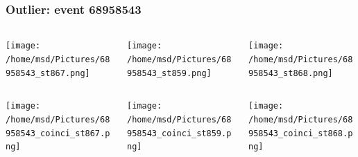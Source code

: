 \documentclass[aspectratio=169]{beamer}
\begin{document}
\begin{frame}
  \frametitle{Outlier: event 68958543}
  \vspace{0.2cm}

  \begin{columns}
    \centering
    \begin{column}{0.33\textwidth}
      \texttt{[image: /home/msd/Pictures/68958543\_st867.png]}
    \end{column}
    \begin{column}{0.33\textwidth}
      \texttt{[image: /home/msd/Pictures/68958543\_st859.png]}
    \end{column}
    \begin{column}{0.33\textwidth}
      \texttt{[image: /home/msd/Pictures/68958543\_st868.png]}
    \end{column}
  \end{columns}
  \vspace{0.2cm}
 
  \begin{columns}
    \centering
    \begin{column}{0.33\textwidth}
      \texttt{[image: /home/msd/Pictures/68958543\_coinci\_st867.png]}
    \end{column}
    \begin{column}{0.33\textwidth}
      \texttt{[image: /home/msd/Pictures/68958543\_coinci\_st859.png]}
    \end{column}
    \begin{column}{0.33\textwidth}
      \texttt{[image: /home/msd/Pictures/68958543\_coinci\_st868.png]}
    \end{column}
  \end{columns}
\end{frame}
\end{document}
